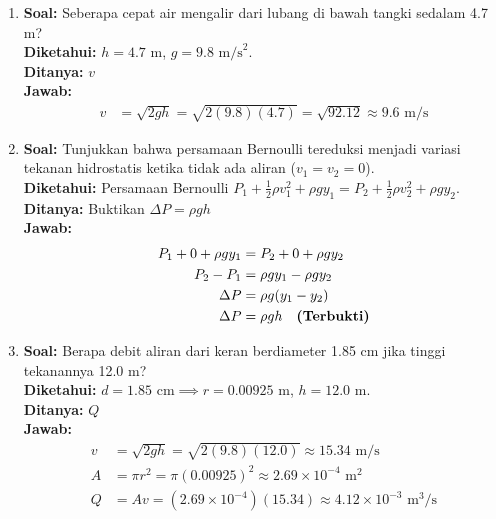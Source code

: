 \documentclass[twocolumn]{article}
\begin{document}
\begin{enumerate}
    \item \textbf{Soal:} Seberapa cepat air mengalir dari lubang di bawah tangki sedalam 4.7 m? \\
    \textbf{Diketahui:} $h = 4.7 \text{ m}$, $g = 9.8 \text{ m/s}^2$. \\
    \textbf{Ditanya:} $v$ \\
    \textbf{Jawab:}
    \begin{align*}
        v &= \sqrt{2gh} = \sqrt{2(9.8)(4.7)} = \sqrt{92.12} \approx 9.6 \text{ m/s}
    \end{align*}

    \item \textbf{Soal:} Tunjukkan bahwa persamaan Bernoulli tereduksi menjadi variasi tekanan hidrostatis ketika tidak ada aliran ($v_1 = v_2 = 0$). \\
    \textbf{Diketahui:} Persamaan Bernoulli $P_1 + \frac{1}{2}\rho v_1^2 + \rho g y_1 = P_2 + \frac{1}{2}\rho v_2^2 + \rho g y_2$. \\
    \textbf{Ditanya:} Buktikan $\Delta P = \rho g h$ \\
    \textbf{Jawab:}
    \begin{align*}
        P_1 + 0 + \rho g y_1 &= P_2 + 0 + \rho g y_2 \\
        P_2 - P_1 &= \rho g y_1 - \rho g y_2 \\
        \Delta P &= \rho g (y_1 - y_2) \\
        \Delta P &= \rho g h \quad \text{\textbf{(Terbukti)}}
    \end{align*}

    \item \textbf{Soal:} Berapa debit aliran dari keran berdiameter 1.85 cm jika tinggi tekanannya 12.0 m? \\
    \textbf{Diketahui:} $d = 1.85 \text{ cm} \implies r = 0.00925 \text{ m}$, $h = 12.0 \text{ m}$. \\
    \textbf{Ditanya:} $Q$ \\
    \textbf{Jawab:}
    \begin{align*}
        v &= \sqrt{2gh} = \sqrt{2(9.8)(12.0)} \approx 15.34 \text{ m/s} \\
        A &= \pi r^2 = \pi (0.00925)^2 \approx 2.69 \times 10^{-4} \text{ m}^2 \\
        Q &= A v = (2.69 \times 10^{-4})(15.34) \approx 4.12 \times 10^{-3} \text{ m}^3/\text{s}
    \end{align*}


\end{enumerate}
\end{document}
